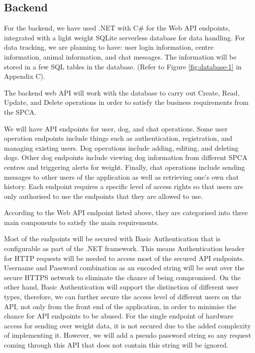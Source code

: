 \subsection{Backend}

For the backend, we have used .NET with C\# for the Web API endpoints, integrated with a light weight SQLite serverless database for data handling. For data tracking, we are planning to have: user login information, centre information, animal information, and chat messages. The information will be stored in a few SQL tables in the database. (Refer to Figure \ref{fig:database-1} in Appendix C).

The backend web API will work with the database to carry out Create, Read, Update, and Delete operations in order to satisfy the business requirements from the SPCA.

We will have API endpoints for user, dog, and chat operations. Some user operation endpoints include things such as authentication, registration, and managing existing users. Dog operations include adding, editing, and deleting dogs. Other dog endpoints include viewing dog information from different SPCA centres and triggering alerts for weight. Finally, chat operations include sending messages to other users of the application as well as retrieving one’s own chat history. Each endpoint requires a specific level of access rights so that users are only authorised to use the endpoints that they are allowed to use.

According to the Web API endpoint listed above, they are categorised into three main components to satisfy the main requirements.

Most of the endpoints will be secured with Basic Authentication that is configurable as part of the .NET framework. This means Authentication header for HTTP requests will be needed to access most of the secured API endpoints. Username and Password combination as an encoded string will be sent over the secure HTTPS network to eliminate the chance of being compromised. On the other hand, Basic Authentication will support the distinction of different user types, therefore, we can further secure the access level of different users on the API, not only from the front end of the application, in order to minimise the chance for API endpoints to be abused. For the single endpoint of hardware access for sending over weight data, it is not secured due to the added complexity of implementing it. However, we will add a pseudo password string so any request coming through this API that does not contain this string will be ignored.


